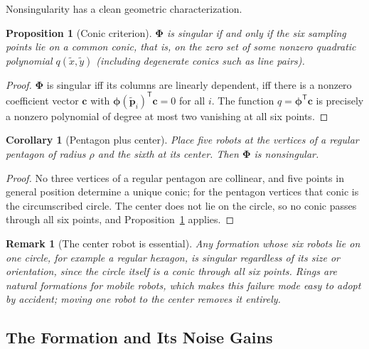 \documentclass[12pt, letterpaper, oneside]{report}
\newtheorem{proposition}[theorem]{Proposition}
\newtheorem{corollary}[theorem]{Corollary}
\newtheorem{remark}[theorem]{Remark}
\begin{document}
Nonsingularity has a clean geometric characterization.

\begin{proposition}[Conic criterion]
\label{prop:conic}
$\boldsymbol{\Phi}$ is singular if and only if the six sampling points lie
on a common conic, that is, on the zero set of some nonzero quadratic
polynomial $q(\tilde x,\tilde y)$ (including degenerate conics such as
line pairs).
\end{proposition}

\begin{proof}
$\boldsymbol{\Phi}$ is singular iff its columns are linearly dependent,
iff there is a nonzero coefficient vector $\mathbf{c}$ with
$\boldsymbol{\phi}(\tilde{\mathbf{p}}_i)^{\mathsf T}\mathbf{c}=0$ for all
$i$. The function $q=\boldsymbol{\phi}^{\mathsf T}\mathbf{c}$ is precisely
a nonzero polynomial of degree at most two vanishing at all six points.
\end{proof}

\begin{corollary}[Pentagon plus center]
\label{cor:pentagon}
Place five robots at the vertices of a regular pentagon of radius $\rho$
and the sixth at its center. Then $\boldsymbol{\Phi}$ is nonsingular.
\end{corollary}

\begin{proof}
No three vertices of a regular pentagon are collinear, and five points in
general position determine a unique conic; for the pentagon vertices that
conic is the circumscribed circle. The center does not lie on the circle,
so no conic passes through all six points, and Proposition~\ref{prop:conic}
applies.
\end{proof}

\begin{remark}[The center robot is essential]
Any formation whose six robots lie on one circle, for example a regular
hexagon, is singular regardless of its size or orientation, since the
circle itself is a conic through all six points. Rings are natural
formations for mobile robots, which makes this failure mode easy to adopt
by accident; moving one robot to the center removes it entirely.
\end{remark}

\subsection{The Formation and Its Noise Gains}
\label{sec:formation}
\end{document}
